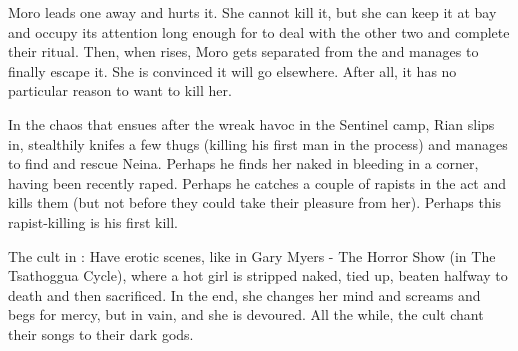   Moro leads one \bane away and hurts it.
  She cannot kill it, but she can keep it at bay and occupy its attention long enough for \Psyrex to deal with the other two \banes and complete their ritual. 
  Then, when \Nithdornazsh rises, Moro gets separated from the \bane and manages to finally escape it.
  She is convinced it will go elsewhere.
  After all, it has no particular reason to want to kill her. 
  
  In the chaos that ensues after the \banes wreak havoc in the Sentinel camp, Rian slips in, stealthily knifes a few thugs (killing his first man in the process) and manages to find and rescue Neina.
  Perhaps he finds her naked in bleeding in a corner, having been recently raped. 
  Perhaps he catches a couple of rapists in the act and kills them (but not before they could take their pleasure from her). 
  Perhaps this rapist-killing is his first kill. 


The cult in \Redce:
  Have erotic scenes, like in Gary Myers - The Horror Show (in The Tsathoggua Cycle), where a hot girl is stripped naked, tied up, beaten halfway to death and then sacrificed. 
  In the end, she changes her mind and screams and begs for mercy, but in vain, and she is devoured. 
  All the while, the cult chant their songs to their dark gods. 















